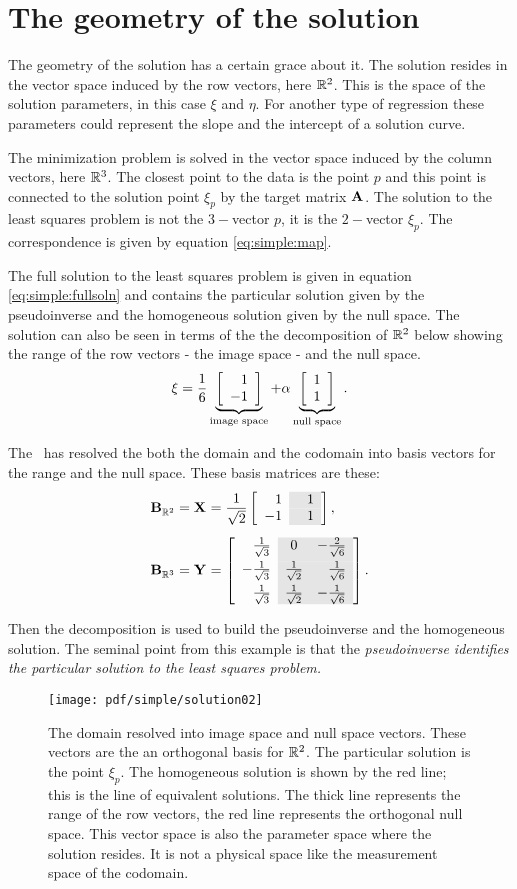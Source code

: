 \section{The geometry of the solution}
The geometry of the solution has a certain grace about it. The solution resides in the vector space induced by the row vectors, here $\real{2}$. This is the space of the solution parameters, in this case $\xi$ and $\eta$. For another type of regression these parameters could represent the slope and the intercept of a solution curve.

The minimization problem is solved in the vector space induced by the column vectors, here $\real{3}$. The closest point to the data is the point $p$ and this point is connected to the solution point $\xi_{p}$ by the target matrix $\A{}$. The solution to the least squares problem is not the $3-$vector $p$, it is the $2-$vector $\xi_{p}$. The correspondence is given by equation \eqref{eq:simple:map}.

The full solution to the least squares problem is given in equation \eqref{eq:simple:fullsoln} and contains the particular solution given by the pseudoinverse and the homogeneous solution given by the null space. The solution can also be seen in terms of the the decomposition of $\real{2}$ below showing the range of the row vectors - the image space - and the null space.
\begin{equation}
    \xi = \frac{1}{6}\underbrace{\mat{r}{1\\-1}}_{\text{image space}} + \alpha \underbrace{\mat{c}{1\\1}}_{\text{null space}}.
\end{equation}

The \svdl \ has resolved the both the domain and the codomain into basis vectors for the range and the null space. These basis matrices are these:
\begin{equation}
  \begin{split}
  \B{}_{\real{2}} &=\X{}= \Xshade,\\[5pt]
  \B{}_{\real{3}} &=\Y{}=\Yshade.
  \end{split}
\end{equation}

Then the decomposition is used to build the pseudoinverse and the homogeneous solution. The seminal point from this example is that the \textit{pseudoinverse identifies the particular solution to the least squares problem.} 

\begin{figure}[htbp] %
   \centering
   \texttt{[image: pdf/simple/solution02]} 
   \caption{The domain resolved into image space and null space vectors. These vectors are the an orthogonal basis for $\real{2}$. The particular solution is the point $\xi_{p}$. The homogeneous solution is shown by the red line; this is the line of equivalent solutions. The thick line represents the range of the row vectors, the red line represents the orthogonal null space. This vector space is also the parameter space where the solution resides. It is not a physical space like the measurement space of the codomain.}
   \label{fig:simple:solution}
\end{figure}

